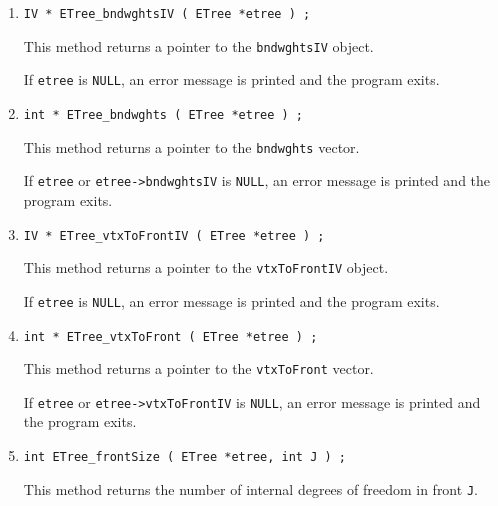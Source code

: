 \begin{enumerate}
\item
\begin{verbatim}
IV * ETree_bndwghtsIV ( ETree *etree ) ;
\end{verbatim}
This method returns a pointer to the {\tt bndwghtsIV} object.
\par {}
If {\tt etree} is {\tt NULL},
an error message is printed and the program exits.
\item
\begin{verbatim}
int * ETree_bndwghts ( ETree *etree ) ;
\end{verbatim}
This method returns a pointer to the {\tt bndwghts} vector.
\par {}
If {\tt etree} or {\tt etree->bndwghtsIV} is {\tt NULL},
an error message is printed and the program exits.
\item
\begin{verbatim}
IV * ETree_vtxToFrontIV ( ETree *etree ) ;
\end{verbatim}
This method returns a pointer to the {\tt vtxToFrontIV} object.
\par {}
If {\tt etree} is {\tt NULL},
an error message is printed and the program exits.
\item
\begin{verbatim}
int * ETree_vtxToFront ( ETree *etree ) ;
\end{verbatim}
This method returns a pointer to the {\tt vtxToFront} vector.
\par {}
If {\tt etree} or {\tt etree->vtxToFrontIV} is {\tt NULL},
an error message is printed and the program exits.
\item
\begin{verbatim}
int ETree_frontSize ( ETree *etree, int J ) ;
\end{verbatim}
This method returns the number of internal degrees of freedom
in front {\tt J}.
\par {}

\end{enumerate}
